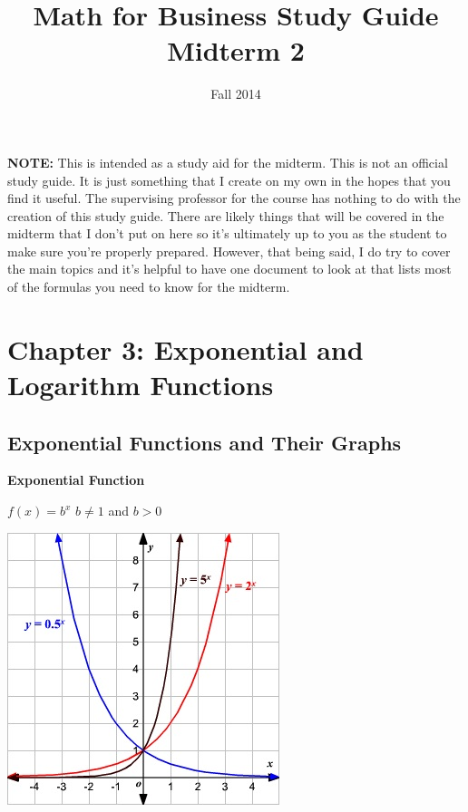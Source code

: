 \documentclass[12pt]{article}
\begin{document}
\title{Math for Business Study Guide Midterm 2}
\date{Fall 2014}
\maketitle

\textbf{NOTE:} This is intended as a study aid for the midterm. This is not an official study guide. It is just something that I create on my own in the hopes that you find it useful. The supervising professor for the course has nothing to do with the creation of this study guide. There are likely things that will be covered in the midterm that I don't put on here so it's ultimately up to you as the student to make sure you're properly prepared. However, that being said, I do try to cover the main topics and it's helpful to have one document to look at that lists most of the formulas you need to know for the midterm.

\section{Chapter 3: Exponential and Logarithm Functions}

\subsection{Exponential Functions and Their Graphs}

\textbf{Exponential Function}
\newline

\centerline{$f(x) = b^x$ \hspace{2cm} $b\neq 1$ and $b > 0$} 

\vspace{.5cm}

\centerline{\includegraphics{ExponentialFunctionsAndGraphs.jpg}}
\end{document}
